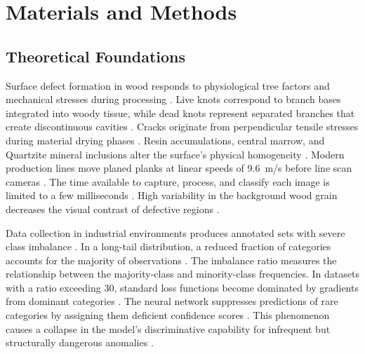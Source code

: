 \documentclass[pdflatex,sn-basic,Numbered,iicol]{sn-jnl}
\begin{document}

\section{Materials and Methods}
\label{sec:methods}

\subsection{Theoretical Foundations}
\label{sec:fundamentals}

Surface defect formation in wood responds to physiological tree factors and mechanical stresses during processing \citep{Yin2021Drying}. Live knots correspond to branch bases integrated into woody tissue, while dead knots represent separated branches that create discontinuous cavities \citep{Chen2023Recognition}. Cracks originate from perpendicular tensile stresses during material drying phases \citep{Yin2021Drying}. Resin accumulations, central marrow, and Quartzite mineral inclusions alter the surface's physical homogeneity \citep{Chen2023Recognition}. Modern production lines move planed planks at linear speeds of 9.6~m/s before line scan cameras \citep{Kodytek2022Dataset}. The time available to capture, process, and classify each image is limited to a few milliseconds \citep{Kodytek2022Dataset}. High variability in the background wood grain decreases the visual contrast of defective regions \citep{Chen2023Recognition}.

Data collection in industrial environments produces annotated sets with severe class imbalance \citep{zhang2021deep}. In a long-tail distribution, a reduced fraction of categories accounts for the majority of observations \citep{zhang2021deep}. The imbalance ratio measures the relationship between the majority-class and minority-class frequencies. In datasets with a ratio exceeding 30, standard loss functions become dominated by gradients from dominant categories \citep{cui2019classbalanced}. The neural network suppresses predictions of rare categories by assigning them deficient confidence scores \citep{tan2020equalization}. This phenomenon causes a collapse in the model's discriminative capability for infrequent but structurally dangerous anomalies \citep{wang2021seesaw}.
\end{document}
